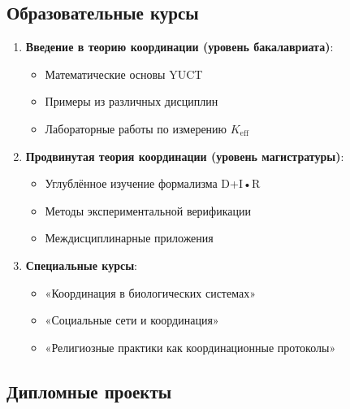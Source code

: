 \documentclass[12pt,a4paper]{article}
\begin{document}
	\subsection{Образовательные курсы}
	
	\begin{enumerate}
		\item \textbf{Введение в теорию координации (уровень бакалавриата)}:
		\begin{itemize}
			\item Математические основы YUCT
			\item Примеры из различных дисциплин
			\item Лабораторные работы по измерению $K_{\mathrm{eff}}$
		\end{itemize}
		
		\item \textbf{Продвинутая теория координации (уровень магистратуры)}:
		\begin{itemize}
			\item Углублённое изучение формализма D+I•R
			\item Методы экспериментальной верификации
			\item Междисциплинарные приложения
		\end{itemize}
		
		\item \textbf{Специальные курсы}:
		\begin{itemize}
			\item «Координация в биологических системах»
			\item «Социальные сети и координация»
			\item «Религиозные практики как координационные протоколы»
		\end{itemize}
	\end{enumerate}
	
	\subsection{Дипломные проекты}
	
\end{document}
